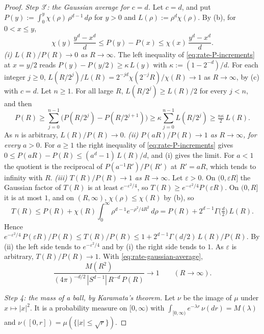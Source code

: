\begin{proof}
\emph{Step 3$'$: the Gaussian average for $c = d$.} Let $c = d$, and put
$P(y) := \int_0^y\chi(\rho)\,\rho^{d-1}\,d\rho$ for $y > 0$ and $L(\rho) := \rho^{d}\chi(\rho)$.
By (b), for $0 < x \le y$,
\begin{equation}\label{eq:rate-P-increments}
  \chi(y)\,\frac{y^{d} - x^{d}}{d} \le P(y) - P(x) \le \chi(x)\,\frac{y^{d} - x^{d}}{d} .
\end{equation}
\emph{(i) $L(R)/P(R) \to 0$ as $R \to \infty$.} The left inequality of
\ref{eq:rate-P-increments} at $x = y/2$ reads $P(y) - P(y/2) \ge \kappa\,L(y)$ with
$\kappa := (1 - 2^{-d})/d$. For each integer $j \ge 0$,
$L(R/2^j)/L(R) = 2^{-jd}\chi(2^{-j}R)/\chi(R) \to 1$ as $R \to \infty$, by (c) with $c = d$. Let
$n \ge 1$. For all large $R$, $L(R/2^j) \ge L(R)/2$ for every $j < n$, and then
\[
  P(R) \ge \sum_{j=0}^{n-1}\bigl(P(R/2^j) - P(R/2^{j+1})\bigr) \ge \kappa\sum_{j=0}^{n-1}L(R/2^j)
   \ge \tfrac{n\kappa}{2}\,L(R) .
\]
As $n$ is arbitrary, $L(R)/P(R) \to 0$.
\emph{(ii) $P(aR)/P(R) \to 1$ as $R \to \infty$, for every $a > 0$.} For $a \ge 1$ the right
inequality of \ref{eq:rate-P-increments} gives
$0 \le P(aR) - P(R) \le (a^{d} - 1)\,L(R)/d$, and (i) gives the limit. For $a < 1$ the quotient is
the reciprocal of $P(a^{-1}R')/P(R')$ at $R' = aR$, which tends to infinity with $R$.
\emph{(iii) $T(R)/P(R) \to 1$ as $R \to \infty$.} Let $\varepsilon > 0$. On $(0, \varepsilon R]$
the Gaussian factor of $T(R)$ is at least $e^{-\varepsilon^2/4}$, so
$T(R) \ge e^{-\varepsilon^2/4}P(\varepsilon R)$. On $(0, R]$ it is at most $1$, and on $(R,\infty)$,
$\chi(\rho) \le \chi(R)$ by (b), so
\[
  T(R) \le P(R) + \chi(R)\int_0^\infty\rho^{d-1}e^{-\rho^2/4R^2}\,d\rho
   = P(R) + 2^{d-1}\Gamma\bigl(\tfrac d2\bigr)\,L(R) .
\]
Hence
$e^{-\varepsilon^2/4}\,P(\varepsilon R)/P(R) \le T(R)/P(R) \le 1 + 2^{d-1}\Gamma(d/2)\,L(R)/P(R)$.
By (ii) the left side tends to $e^{-\varepsilon^2/4}$ and by (i) the right side tends to $1$. As
$\varepsilon$ is arbitrary, $T(R)/P(R) \to 1$. With \ref{eq:rate-gaussian-average},
\begin{equation}\label{eq:rate-abelian-critical}
  \frac{M(R^2)}{(4\pi)^{-d/2}\,|S^{d-1}|\,R^{-d}\,P(R)} \to 1 \qquad (R \to \infty) .
\end{equation}

\emph{Step 4: the mass of a ball, by Karamata's theorem.} Let $\nu$ be the image of $\mu$ under
$x \mapsto |x|^2$. It is a probability measure on $[0,\infty)$ with
$\int_{[0,\infty)}e^{-\lambda r}\,\nu(dr) = M(\lambda)$ and $\nu([0,r]) = \mu(\{|x| \le \sqrt r\})$.


\end{proof}
